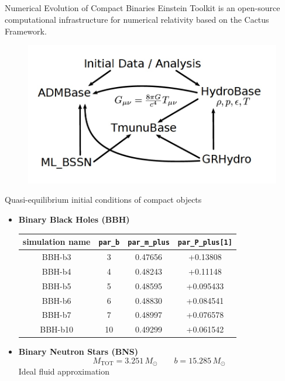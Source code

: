 \documentclass{beamer}
\theoremstyle{definition}
\theoremstyle{plain}
\begin{document}
\subsection{}
\begin{frame}{Numerical Evolution of Compact Binaries}
\vspace{0.5cm}
Einstein Toolkit is an open-source
computational infrastructure for numerical relativity based on the Cactus Framework.
\begin{figure}
\includegraphics[scale=0.3]{ET}
\end{figure}

\end{frame}

\begin{frame}{Quasi-equilibrium initial conditions of compact objects}

\vspace{1cm}
\begin{itemize}
\item \textbf{Binary Black Holes (BBH)}
\begin{table}
\centering
\begin{tabular}{|c|c|c|c|}
\hline 
simulation name & \texttt{par\_b} & \texttt{par\_m\_plus} & \texttt{par\_P\_plus[1]} \\ 
\hline 
BBH-b3 & 3 & 0.47656
 & +0.13808 \\ 
\hline 
BBH-b4 & 4 & 0.48243 & +0.11148 \\ 
\hline 
BBH-b5 & 5 & 0.48595 & +0.095433 \\ 
\hline 
BBH-b6 & 6 & 0.48830 & +0.084541 \\ 
\hline 
BBH-b7 & 7 &  0.48997 & +0.076578 \\ 
\hline 
BBH-b10 & 10 & 0.49299 & +0.061542 \\ 
\hline 
\end{tabular} 
\end{table}
\vspace{0.5cm}
\item \textbf{Binary Neutron Stars (BNS)}
\[
M_{\text{TOT}} = 3.251 \, M_{\odot} \qquad 
b=15.285 \, M_{\odot}
\]
Ideal fluid approximation
	\end{itemize}
	\vspace{1cm}
\end{frame}
\end{document}

